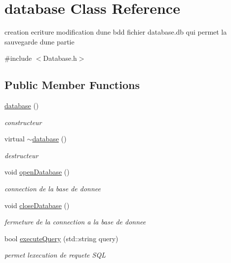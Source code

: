 \hypertarget{classdatabase}{}\section{database Class Reference}
\label{classdatabase}


creation ecriture modification d\textquotesingle{}une bdd fichier database.\+db qui permet la sauvegarde d\textquotesingle{}une partie  




{\ttfamily \#include $<$Database.\+h$>$}

\subsection*{Public Member Functions}
\begin{DoxyCompactItemize}
\item 
\mbox{\hyperlink{classdatabase_a35ec480ed529a9d092a7ebc5472b767f}{database}} ()
\begin{DoxyCompactList}\small\item\em constructeur \end{DoxyCompactList}\item 
virtual \mbox{\hyperlink{classdatabase_a31008de680565a626cd975c25d4351db}{$\sim$database}} ()
\begin{DoxyCompactList}\small\item\em destructeur \end{DoxyCompactList}\item 
void \mbox{\hyperlink{classdatabase_a746cfcb8f33de37f99cabce2eef26d2d}{open\+Database}} ()
\begin{DoxyCompactList}\small\item\em connection de la base de donnee \end{DoxyCompactList}\item 
void \mbox{\hyperlink{classdatabase_a9c47659b372a4f36bf68413499d4ea95}{close\+Database}} ()
\begin{DoxyCompactList}\small\item\em fermeture de la connection a la base de donnee \end{DoxyCompactList}\item 
bool \mbox{\hyperlink{classdatabase_a2ca3b61b5dbb7f02220fd5bc277dcb8a}{execute\+Query}} (std\+::string query)
\begin{DoxyCompactList}\small\item\em permet l\textquotesingle{}execution de requete S\+QL \end{DoxyCompactList}\item 

\end{DoxyCompactItemize}
